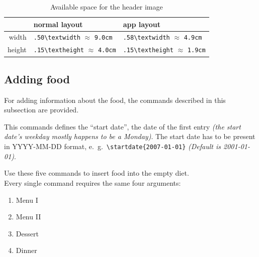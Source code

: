 \documentclass[11pt]{ltxdoc}
\begin{document}
	\begin{table}[b]\centering\sffamily\small\renewcommand{\arraystretch}{1.25}
		\begin{tabular}{r*{2}{|>{\centering\ttfamily}m{.25\textwidth}<{\arraybackslash}}}
			       & \textsf{normal layout}                                & app \textsf{layout}                                   \tabularnewline\hline\hline
			 width & \verb|.50\textwidth|  \newline $\approx$ \verb|9.0cm| & \verb|.58\textwidth|  \newline $\approx$ \verb|4.9cm| \tabularnewline\hline
			height & \verb|.15\textheight| \newline $\approx$ \verb|4.0cm| & \verb|.15\textheight| \newline $\approx$ \verb|1.9cm|
		\end{tabular}
	
		\rmfamily
		\caption{Available space for the header image}
		\label{tab:image-sizes}
	\end{table}
	
	
	\subsection{Adding food}
	For adding information about the food, the commands described in this subsection are provided.
	
	\medskip
	\DescribeMacro{\startdate}
	This commands defines the \enquote{start date}, the date of the first entry \textit{(the start date's weekday mostly happens to be a Monday)}. The start date has to be present in \textsf{YYYY-MM-DD} format, e.~g.~\verb|\startdate{2007-01-01}| \textit{(Default is 2001-01-01)}.
	
	\medskip
	\DescribeMacro{\monday}\DescribeMacro{\tuesday}\DescribeMacro{\wednesday}\DescribeMacro{\thursday}\DescribeMacro{\friday}
	Use these five commands to insert food into the empty diet. \\
	Every single command requires the same four arguments:
	\begin{multicols}{4}
		\begin{enumerate}\itemsep0pt
			\item Menu I
			\item Menu II
			\item Dessert
			\item Dinner
		\end{enumerate}
	\end{multicols}
\end{document}

